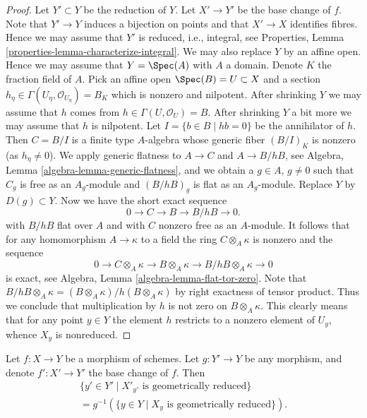\begin{proof}
Let $Y' \subset Y$ be the reduction of $Y$. Let $X' \to Y'$
be the base change of $f$. Note that $Y' \to Y$
induces a bijection on points and that $X' \to X$ identifies fibres.
Hence we may assume that $Y'$ is reduced, i.e., integral, see
Properties, Lemma \ref{properties-lemma-characterize-integral}.
We may also replace $Y$ by an affine open. Hence we may assume that
$Y = \Spec(A)$ with $A$ a domain. Denote $K$ the
fraction field of $A$.
Pick an affine open $\Spec(B) = U \subset X$ and a section
$h_\eta \in \Gamma(U_\eta, \mathcal{O}_{U_\eta}) = B_K$
which is nonzero and nilpotent.
After shrinking $Y$ we may assume that $h$ comes from
$h \in \Gamma(U, \mathcal{O}_U) = B$. After shrinking $Y$ a bit
more we may assume that $h$ is nilpotent. Let
$I = \{b \in B \mid hb = 0\}$ be the annihilator of $h$.
Then $C = B/I$ is a finite type $A$-algebra whose generic fiber
$(B/I)_K$ is nonzero (as $h_\eta \not = 0$). We apply
generic flatness to $A \to C$ and $A \to B/hB$, see
Algebra, Lemma \ref{algebra-lemma-generic-flatness},
and we obtain a $g \in A$, $g \not = 0$ such that $C_g$ is free as
an $A_g$-module and $(B/hB)_g$ is flat as an $A_g$-module.
Replace $Y$ by $D(g) \subset Y$. Now we have the short exact sequence
$$
0 \to C \to B \to B/hB \to 0.
$$
with $B/hB$ flat over $A$ and with $C$ nonzero free as an $A$-module.
It follows that for any homomorphism $A \to \kappa$ to a field
the ring $C \otimes_A \kappa$ is nonzero and the sequence
$$
0 \to C \otimes_A \kappa \to B \otimes_A \kappa \to
B/hB \otimes_A \kappa \to 0
$$
is exact, see
Algebra, Lemma \ref{algebra-lemma-flat-tor-zero}.
Note that
$B/hB \otimes_A \kappa = (B \otimes_A \kappa) / h(B \otimes_A \kappa)$
by right exactness of tensor product. Thus we conclude that
multiplication by $h$ is not zero on $B \otimes_A \kappa$.
This clearly means that for any point $y \in Y$ the element $h$
restricts to a nonzero element of $U_y$, whence $X_y$ is nonreduced.
\end{proof}

\begin{lemma}
\label{lemma-base-change-fibres-geometrically-reduced}
Let $f : X \to Y$ be a morphism of schemes.
Let $g : Y' \to Y$ be any morphism, and denote
$f' : X' \to Y'$ the base change of $f$.
Then
\begin{align*}
\{y' \in Y' \mid X'_{y'}\text{ is geometrically reduced}\} \\
= g^{-1}(\{y \in Y \mid X_y\text{ is geometrically reduced}\}).
\end{align*}
\end{lemma}

